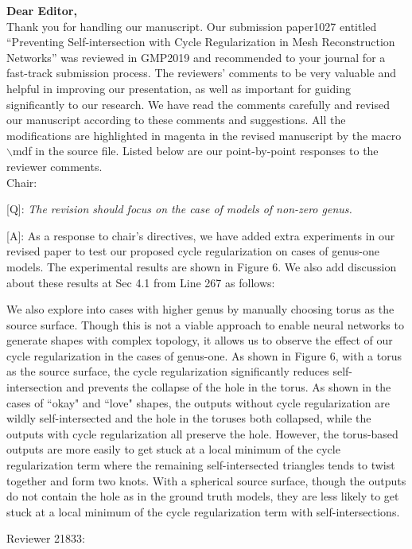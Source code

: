 \documentclass[10pt]{letter} %
\newcommand{\mdf}[1]{\textcolor[rgb]{1.00,0.00,1.00}{#1}}
\begin{document}
	\textbf{Dear Editor,}\\
	Thank you for handling our manuscript. Our submission paper1027 entitled ``Preventing Self-intersection with Cycle Regularization in Mesh
	Reconstruction Networks'' was reviewed in GMP2019 and recommended to your journal for a fast-track submission process. The reviewers’ comments to be very valuable and helpful in improving our presentation, as well as important for guiding significantly to our research. We have read the comments carefully and revised our manuscript according to these comments and suggestions. All the modifications are \mdf{highlighted in magenta} in the revised manuscript by the macro $\backslash$mdf in the source file. Listed below are our point-by-point responses to the reviewer comments.\\
	
	\hdashrule{\linewidth}{1pt}{1mm}
	Chair:
	
	[Q]: \emph{The revision should focus on the case of models of non-zero genus.}
	
	[A]: As a response to chair's directives, we have added extra experiments in our revised paper to test our proposed cycle regularization on cases of genus-one models. The experimental results are shown in Figure 6. We also add discussion about these results at Sec 4.1 from Line 267 as follows:
	 
	\mdf{We also explore into cases with higher genus by manually choosing torus as the source surface. Though this is not a viable approach to enable neural networks to generate shapes with complex topology, it allows us to observe the effect of our cycle regularization in the cases of genus-one. As shown in Figure 6, with a torus as the source surface, the cycle regularization significantly reduces self-intersection and prevents the collapse of the hole in the torus. As shown in the cases of ``okay" and ``love" shapes, the outputs without cycle regularization are wildly self-intersected and the hole in the toruses both collapsed, while the outputs with cycle regularization all preserve the hole. However, the torus-based outputs are more easily to get stuck at a local minimum of the cycle regularization term where the remaining self-intersected triangles tends to twist together and form two knots. With a spherical source surface, though the outputs do not contain the hole as in the ground truth models, they are less likely to get stuck at a local minimum of the cycle regularization term with self-intersections.
	}
	
	\hdashrule{\linewidth}{1pt}{1mm}
	Reviewer 21833:
	
\end{document}
